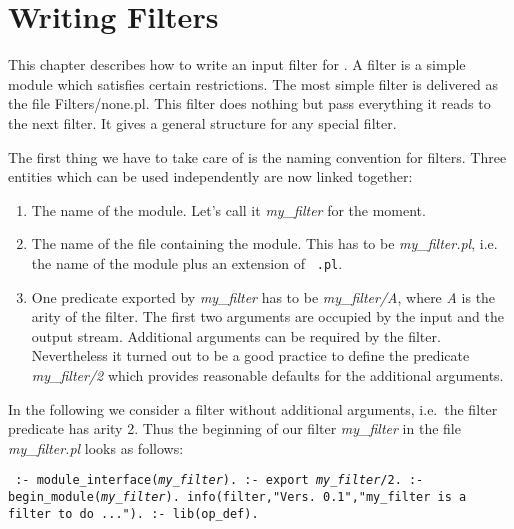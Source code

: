 
\chapter{Writing Filters}\label{chap:writing.filters}

This chapter describes how to write an input filter for \ProTop. A filter is a
simple \eclipse{} module which satisfies certain restrictions. The most simple
filter is delivered as the file {\sf Filters/none.pl}. This filter does
nothing but pass everything it reads to the next filter. It gives a general
structure for any special filter.

The first thing we have to take care of is the naming convention for filters.
Three entities which can be used independently are now linked together:
\begin{enumerate}
\item The name of the module. Let's call it {\em my\_filter} for the moment.
\item The name of the file containing the module. This has to be {\em
    my\_filter.pl}, i.e. the name of the module plus an extension of {\tt
    .pl}.
\item One predicate exported by {\em my\_filter}\/ has to be {\em
    my\_filter/A}, where {\em A}\/ is the arity of the filter. The first two
  arguments are occupied by the input and the output stream. Additional
  arguments can be required by the filter. Nevertheless it turned out to be a
  good practice to define the predicate {\em my\_filter/2} which provides
  reasonable defaults for the additional arguments.
\end{enumerate}

In the following we consider a filter without additional arguments, i.e.\ the
filter predicate has arity 2.  Thus the beginning of our filter {\em
  my\_filter} in the file {\em my\_filter.pl} looks as follows:

\begin{BoxedSample}\raggedright\tt
:- module\_interface({\em my\_filter}).
:- export {\em my\_filter}/2.
:- begin\_module({\em my\_filter}).
info(filter,"Vers. 0.1","my\_filter is a filter to do ...").
:- lib(op\_def).
\end{BoxedSample}

